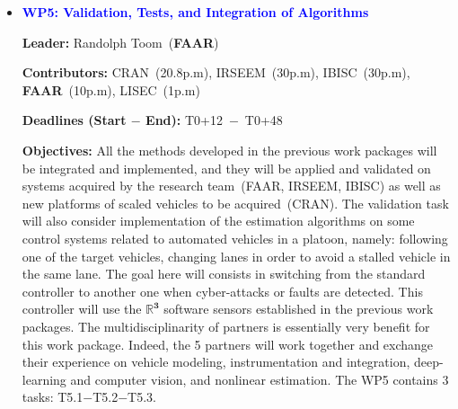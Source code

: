 \documentclass[a4paper,11pt]{article}
\begin{document}
\begin{itemize}[leftmargin=.2in,noitemsep,nolistsep]
\begin{tcolorbox}[breakable, enhanced,  colback=yellow!2!white,
title = \bf Deliverables$-$Risks and Fallback Solutions, coltitle= black, colbacktitle=yellow!7!white, halign title=center]
\end{tcolorbox}




%
\item \textcolor{blue}{\bf WP5: Validation, Tests, and Integration of Algorithms}\\
%
\vspace{-0.5cm}
\begin{tcolorbox}[breakable, enhanced,  colback=blue!2!white,
title = \bf Contributors$-$Deadlines$-$Objectives, coltitle= black, colbacktitle=brown!90!white, halign title=center]

{ \bf {Leader}:} Randolph {\sc Toom}~({\bf FAAR})

{ \bf {Contributors}:} {\small CRAN~(\textcolor{navyblue}{20.8p.m}), IRSEEM~(\textcolor{navyblue}{30p.m}), IBISC~(\textcolor{navyblue}{30p.m}), {\bf FAAR}~(\textcolor{navyblue}{10p.m}), LISEC~(\textcolor{navyblue}{1p.m})}

{ \bf {Deadlines (Start $-$ End)}:} T0+12~$-$~T0+48

{ \bf {Objectives}:} All the methods developed in the previous work packages will be integrated and implemented, and they will be applied and validated on systems acquired by the research team~(FAAR, IRSEEM, IBISC) as well as new platforms of scaled vehicles to be acquired~(CRAN). The validation task will also consider implementation of the estimation algorithms on some control systems related to automated vehicles in a platoon, namely: following one of the target vehicles, changing lanes in order to avoid a stalled vehicle in the same lane. The goal here will consists in switching from the standard controller to another one when cyber-attacks or faults are detected. This controller will use the $\pmb{\mathbb{R}^{3}}$ software sensors established in the previous work packages. The multidisciplinarity of partners is essentially very benefit for this work package. Indeed, the 5 partners will work together and exchange their experience on vehicle modeling, instrumentation and integration, deep-learning and computer vision, and nonlinear estimation. The WP5 contains 3 tasks: T5.1$-$T5.2$-$T5.3.


\end{tcolorbox}
\end{itemize}
\end{document}
